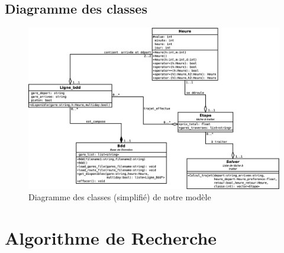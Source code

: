\documentclass[a4paper,10pt,twoside]{report}
\begin{document}
    \section{Diagramme des classes}
    \begin{figure}[h]
    \centering
    \includegraphics[width=\textwidth]{Diagram1.eps}
    \caption{Diagramme des classes (simplifié) de notre modèle}
    \label{diagclasse}
    \end{figure}
    

\chapter{Algorithme de Recherche}
\label{algorithme}
   
   
   
\end{document}
